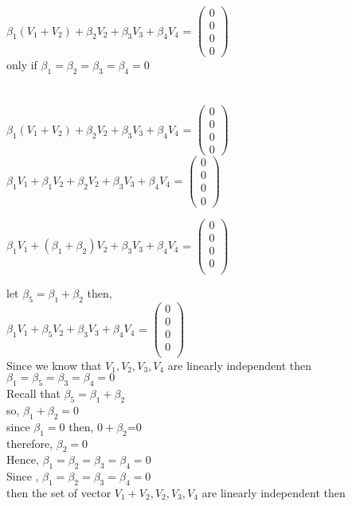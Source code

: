 \documentclass[45pt]{article}
\begin{document}
\begin{enumerate}
$\beta_1 (V_1+V_2)+\beta_2 V_2+\beta_3 V_3+ \beta_4 V_4$ =
$\begin{pmatrix}
0\\0\\0\\0
\end{pmatrix}
$ \\
 
 only if $\beta_1 = \beta_2 =\beta_3= \beta_4=0$\\\\
 
\\
$\beta_1 (V_1+V_2)+\beta_2 V_2+\beta_3 V_3+ \beta_4 V_4$ =
$\begin{pmatrix}
0\\0\\0\\0
\end{pmatrix}
$ \\

$\beta_1 V_1+ \beta_1 V_2+\beta_2 V_2+\beta_3 V_3+ \beta_4 V_4$ =
$\begin{pmatrix}
0\\0\\0\\0
\end{pmatrix}
$ 

$\beta_1 V_1+ (\beta_1 +\beta_2) V_2+\beta_3 V_3+ \beta_4 V_4$ =
$\begin{pmatrix}
0\\0\\0\\0\\
\end{pmatrix}$

let $\beta_5=\beta_1+\beta_2$ then,\\

$\beta_1 V_1+ \beta_5  V_2+\beta_3 V_3+ \beta_4 V_4$ =
$\begin{pmatrix}
0\\0\\0\\0\\
\end{pmatrix}$\\
Since we know that $V_1,V_2,V_3,V_4$ are linearly independent then \\ $\beta_1=\beta_5=\beta_3=\beta_4=0$\\
Recall that $\beta_5=\beta_1+\beta_2$\\
so, $\beta_1+\beta_2=0$\\ 
since $\beta_1=0$ then, $0+\beta_2$=0\\  
therefore, $\beta_2=0$\\
Hence, $\beta_1=\beta_2=\beta_3=\beta_4=0$\\ 
Since , $\beta_1=\beta_2=\beta_3=\beta_4=0$\\ 
then the set of vector  {$V_1+V_2,V_2,V_3,V_4$} are linearly independent then \\


\end{enumerate}
\end{document}
